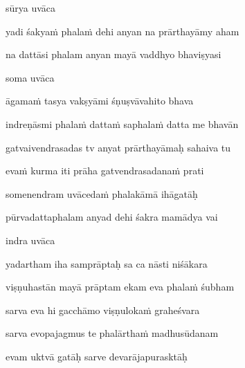 sūrya uvāca~{\dandab}\dontdisplaylinenum 

yadi śakyaṁ phalaṁ dehi anyan na prārthayāmy aham\thinspace{\danda} \dontdisplaylinenum

na dattāsi phalam anyan mayā vaddhyo bhaviṣyasi \veg\dontdisplaylinenum
{}

soma uvāca~{\dandab}\dontdisplaylinenum 

āgamaṁ tasya vakṣyāmi śṇuṣvāvahito bhava\thinspace{\danda} \dontdisplaylinenum

indreṇāsmi phalaṁ dattaṁ saphalaṁ datta me bhavān \veg\dontdisplaylinenum

gatvaivendrasadas tv anyat prārthayāmaḥ sahaiva tu\thinspace{\dandab} \dontdisplaylinenum

evaṁ kurma iti prāha gatvendrasadanaṁ prati \veg\dontdisplaylinenum
{}

somenendram uvācedaṁ phalakāmā ihāgatāḥ\thinspace{\dandab} \dontdisplaylinenum

pūrvadattaphalam anyad dehi śakra mamādya vai \veg\dontdisplaylinenum
{}

indra uvāca~{\dandab}\dontdisplaylinenum 

yadartham iha samprāptaḥ sa ca nāsti niśākara\thinspace{\danda} \dontdisplaylinenum

viṣṇuhastān mayā prāptam ekam eva phalaṁ śubham \veg\dontdisplaylinenum
{}

sarva eva hi gacchāmo viṣṇulokaṁ graheśvara\thinspace{\dandab} \dontdisplaylinenum

sarva evopajagmus te phalārthaṁ madhusūdanam \veg\dontdisplaylinenum
{}

evam uktvā gatāḥ sarve devarājapurasktāḥ\thinspace{\dandab} \dontdisplaylinenum

